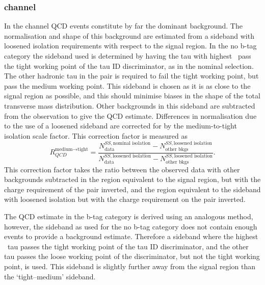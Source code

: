 \subsubsection{\texorpdfstring{\tautau channel}{tau tau channel}}
\label{sec:mssm_bkgs_qcd_tt}
In the \tautau channel QCD events constitute by far the dominant background.
The normalisation and shape 
of this background are estimated from a sideband with loosened 
isolation requirements with respect to the signal region. 
In the no b-tag category the sideband used is determined
by having the tau with highest \pT~pass the tight working
point of the tau ID discriminator, as in the nominal selection.
The other hadronic tau in the pair is required to fail the tight working point,
but pass the medium working point. This sideband is 
chosen as it is as close to the signal region as possible, and 
this should minimise biases in the shape of the total transverse mass
distribution. Other backgrounds
in this sideband are subtracted from the observation to give
the QCD estimate. Differences in normalisation due to
the use of a loosened sideband are corrected for by the medium-to-tight isolation
scale factor. This correction factor is measured as
\begin{equation}\label{eqn:tautau_qcd}
R_{QCD}^{\text{medium}\rightarrow\text{tight}} = \frac{N_{\text{data}}^{SS,\text{nominal isolation}}-N_{\text{other bkgs}}^{SS,\text{loosened isolation}}}{N_{\text{data}}^{SS,\text{loosened isolation}}-N_{\text{other bkgs}}^{SS,\text{loosened isolation}}}.
\end{equation}
This correction factor takes the ratio between the observed data with other
backgrounds subtracted in the region equivalent to the signal region, but with the
charge requirement of the pair inverted, and the region equivalent to the sideband
with loosened isolation but with the charge requirement on the pair inverted.

The QCD estimate in the b-tag category is derived using an analogous method, 
 however, the sideband as used for the 
no b-tag category does not contain enough events to 
provide a background estimate. Therefore a sideband where
the highest \pT~tau passes the tight working point of the
tau ID discriminator, and the other tau passes the loose working
point of the discriminator, but not the tight working point, is used.
This sideband is slightly further away from the signal region than the
`tight--medium' sideband. %

